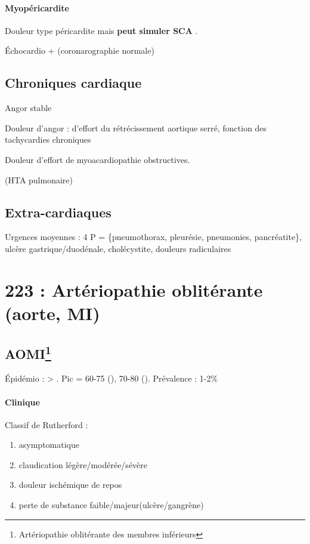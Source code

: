 \documentclass{article}
\begin{document}
\paragraph{Myopéricardite}
Douleur type péricardite mais \textbf{peut simuler SCA} .

Échocardio + (coronarographie normale)

\subsection{Chroniques cardiaque}
Angor stable

Douleur d'angor : d'effort du rétrécissement aortique serré, fonction des
tachycardies chroniques

Douleur d'effort de myoacardiopathie obstructives.

(HTA pulmonaire)

\subsection{Extra-cardiaques}
Urgences moyennes : 4 P = \{pneumothorax, pleurésie,
pneumonies, pancréatite\}, ulcère gastrique/duodénale, cholécystite, douleurs
radiculaires

\section{223 : Artériopathie oblitérante (aorte, MI)}%
\label{sec:223_arteriopathie_obliterante_aorte_mi_}
\subsection{AOMI\footnote{Artériopathie oblitérante des membres inférieurs}}

Épidémio : \male > \female. Pic = 60-75 (\male), 70-80 (\female). Prévalence :
1-2\%

\paragraph{Clinique}
Classif de Rutherford : 
\begin{enumerate}[label=\Roman*]
  \item asymptomatique 
  \item claudication légère/modérée/sévère
  \item douleur ischémique de repos 
  \item perte de substance faible/majeur(ulcère/gangrène)
\end{enumerate}
\end{document}

